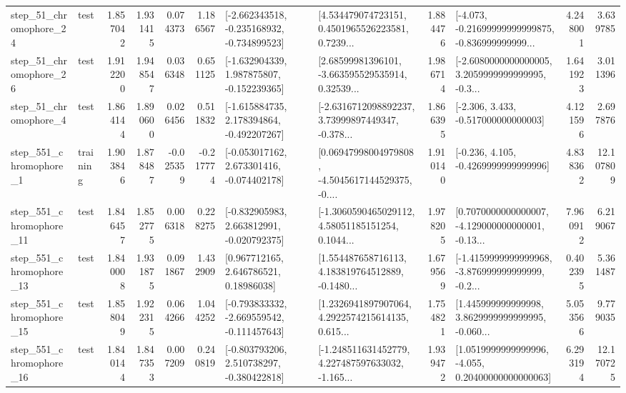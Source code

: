 \begin{tabular}{llrrrrllrlrr}
   step\_51\_chromophore\_24 &      test &      1.857042 &    1.931415 &      0.074373 &  1.186567 &  [-2.662343518, -0.235168932, -0.734899523] &  [4.534479074723151, 0.4501965526223581, 0.7239... &       1.884476 &  [-4.073, -0.21699999999999875, -0.836999999999... &            4.248001 &          3.639785 \\
   step\_51\_chromophore\_26 &      test &      1.912200 &    1.948547 &      0.036348 &  0.651125 &   [-1.632904339, 1.987875807, -0.152239365] &  [2.68599981396101, -3.663595529535914, 0.32539... &       1.986714 &  [-2.6080000000000005, 3.2059999999999995, -0.3... &            1.641923 &          3.011396 \\
    step\_51\_chromophore\_4 &      test &      1.864144 &    1.890600 &      0.026456 &  0.511832 &   [-1.615884735, 2.178394864, -0.492207267] &  [-2.6316712098892237, 3.73999897449347, -0.378... &       1.866395 &                [-2.306, 3.433, -0.517000000000003] &            4.121596 &          2.697876 \\
   step\_551\_chromophore\_1 &  training &      1.903846 &    1.878487 &     -0.025359 & -0.217774 &   [-0.053017162, 2.673301416, -0.074402178] &  [0.06947998004979808, -4.5045617144529375, -0.... &       1.910140 &               [-0.236, 4.105, -0.4269999999999996] &            4.838362 &         12.107809 \\
  step\_551\_chromophore\_11 &      test &      1.846457 &    1.852775 &      0.006318 &  0.228275 &   [-0.832905983, 2.663812991, -0.020792375] &  [-1.3060590465029112, 4.58051185151254, 0.1044... &       1.978205 &  [0.7070000000000007, -4.129000000000001, -0.13... &            7.960912 &          6.219067 \\
  step\_551\_chromophore\_13 &      test &      1.840008 &    1.931875 &      0.091867 &  1.432909 &      [0.967712165, 2.646786521, 0.18986038] &  [1.554487658716113, 4.183819764512889, -0.1480... &       1.679569 &  [-1.4159999999999968, -3.876999999999999, -0.2... &            0.402395 &          5.361487 \\
  step\_551\_chromophore\_15 &      test &      1.858049 &    1.922315 &      0.064266 &  1.044252 &  [-0.793833332, -2.669559542, -0.111457643] &  [1.2326941897907064, 4.2922574215614135, 0.615... &       1.754821 &  [1.445999999999998, 3.8629999999999995, -0.060... &            5.053566 &          9.779035 \\
  step\_551\_chromophore\_16 &      test &      1.840144 &    1.847353 &      0.007209 &  0.240819 &   [-0.803793206, 2.510738297, -0.380422818] &  [-1.248511631452779, 4.227487597633032, -1.165... &       1.939472 &  [1.0519999999999996, -4.055, 0.20400000000000063] &            6.293194 &         12.170725 \\

\end{tabular}

